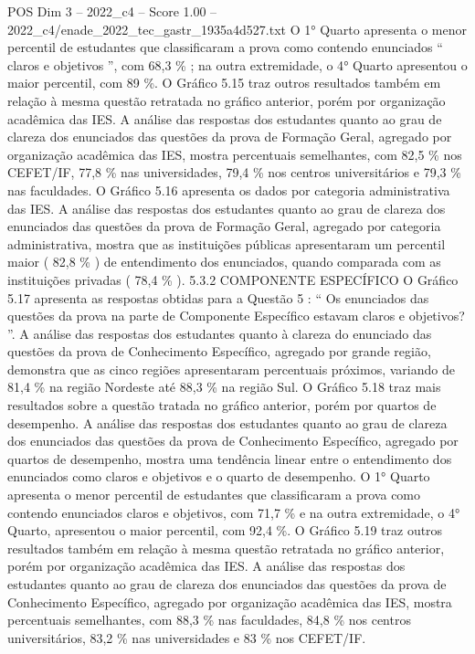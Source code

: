 \begin{textsample}{POS Dim 3 – 2022\_c4 – Score 1.00 – 2022\_c4/enade\_2022\_tec\_gastr\_1935a4d527.txt}
O 1{\EmojiFont °} Quarto apresenta o menor percentil de estudantes que classificaram a prova como contendo enunciados “ claros e objetivos ”, com 68,3 \% ; na outra extremidade, o 4{\EmojiFont °} Quarto apresentou o maior percentil, com 89 \%.
O Gráfico 5.15 traz outros resultados também em relação à mesma questão retratada no gráfico anterior, porém por organização acadêmica das IES.
A análise das respostas dos estudantes quanto ao grau de clareza dos enunciados das questões da prova de Formação Geral, agregado por organização acadêmica das IES, mostra percentuais semelhantes, com 82,5 \% nos CEFET/IF, 77,8 \% nas universidades, 79,4 \% nos centros universitários e 79,3 \% nas faculdades.
O Gráfico 5.16 apresenta os dados por categoria administrativa das IES.
A análise das respostas dos estudantes quanto ao grau de clareza dos enunciados das questões da prova de Formação Geral, agregado por categoria administrativa, mostra que as instituições públicas apresentaram um percentil maior ( 82,8 \% ) de entendimento dos enunciados, quando comparada com as instituições privadas ( 78,4 \% ). 5.3.2 COMPONENTE ESPECÍFICO O Gráfico 5.17 apresenta as respostas obtidas para a Questão 5 : “ Os enunciados das questões da prova na parte de Componente Específico estavam claros e objetivos? ”.
A análise das respostas dos estudantes quanto à clareza do enunciado das questões da prova de Conhecimento Específico, agregado por grande região, demonstra que as cinco regiões apresentaram percentuais próximos, variando de 81,4 \% na região Nordeste até 88,3 \% na região Sul.
O Gráfico 5.18 traz mais resultados sobre a questão tratada no gráfico anterior, porém por quartos de desempenho.
A análise das respostas dos estudantes quanto ao grau de clareza dos enunciados das questões da prova de Conhecimento Específico, agregado por quartos de desempenho, mostra uma tendência linear entre o entendimento dos enunciados como claros e objetivos e o quarto de desempenho.
O 1{\EmojiFont °} Quarto apresenta o menor percentil de estudantes que classificaram a prova como contendo enunciados claros e objetivos, com 71,7 \% e na outra extremidade, o 4{\EmojiFont °} Quarto, apresentou o maior percentil, com 92,4 \%.
O Gráfico 5.19 traz outros resultados também em relação à mesma questão retratada no gráfico anterior, porém por organização acadêmica das IES.
A análise das respostas dos estudantes quanto ao grau de clareza dos enunciados das questões da prova de Conhecimento Específico, agregado por organização acadêmica das IES, mostra percentuais semelhantes, com 88,3 \% nas faculdades, 84,8 \% nos centros universitários, 83,2 \% nas universidades e 83 \% nos CEFET/IF.

\end{textsample}
